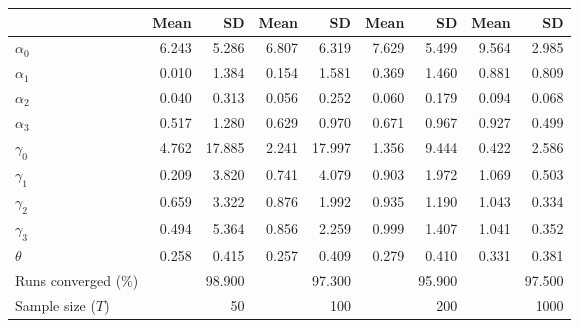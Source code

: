 
\begin{tabular}[t]{lrrrrrrrr}
\toprule
  & Mean & SD & Mean  & SD  & Mean   & SD   & Mean    & SD   \\
\midrule
$\alpha_{0}$ & 6.243 & 5.286 & 6.807 & 6.319 & 7.629 & 5.499 & 9.564 & 2.985\\
$\alpha_{1}$ & 0.010 & 1.384 & 0.154 & 1.581 & 0.369 & 1.460 & 0.881 & 0.809\\
$\alpha_{2}$ & 0.040 & 0.313 & 0.056 & 0.252 & 0.060 & 0.179 & 0.094 & 0.068\\
$\alpha_{3}$ & 0.517 & 1.280 & 0.629 & 0.970 & 0.671 & 0.967 & 0.927 & 0.499\\
$\gamma_{0}$ & 4.762 & 17.885 & 2.241 & 17.997 & 1.356 & 9.444 & 0.422 & 2.586\\
$\gamma_{1}$ & 0.209 & 3.820 & 0.741 & 4.079 & 0.903 & 1.972 & 1.069 & 0.503\\
$\gamma_{2}$ & 0.659 & 3.322 & 0.876 & 1.992 & 0.935 & 1.190 & 1.043 & 0.334\\
$\gamma_{3}$ & 0.494 & 5.364 & 0.856 & 2.259 & 0.999 & 1.407 & 1.041 & 0.352\\
$\theta$ & 0.258 & 0.415 & 0.257 & 0.409 & 0.279 & 0.410 & 0.331 & 0.381\\
Runs converged (\%) &  & 98.900 &  & 97.300 &  & 95.900 &  & 97.500\\
Sample size ($T$) &  & 50 &  & 100 &  & 200 &  & 1000\\
\bottomrule
\end{tabular}
